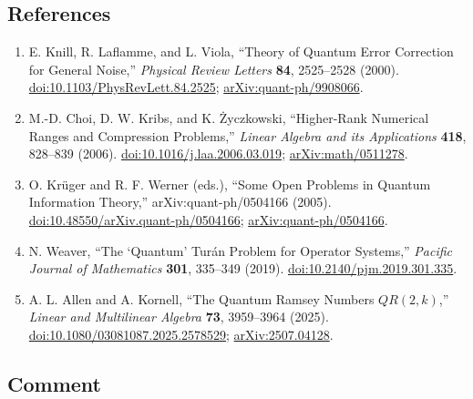 \subsection*{References}

\begin{enumerate}[label={},leftmargin=4.8em,labelsep=0.5em]
  \footnotesize
  \item[\textup{[KLV00]}]\label{ref:p14-knill-laflamme-viola}
  E. Knill, R. Laflamme, and L. Viola,
  ``Theory of Quantum Error Correction for General Noise,''
  \emph{Physical Review Letters} \textbf{84}, 2525--2528 (2000).
  \href{https://doi.org/10.1103/PhysRevLett.84.2525}{doi:10.1103/PhysRevLett.84.2525};
  \href{https://arxiv.org/abs/quant-ph/9908066}{arXiv:quant-ph/9908066}.

  \item[\textup{[CKZ06]}]\label{ref:p14-choi-et-al}
  M.-D. Choi, D. W. Kribs, and K. Życzkowski,
  ``Higher-Rank Numerical Ranges and Compression Problems,''
  \emph{Linear Algebra and its Applications} \textbf{418}, 828--839 (2006).
  \href{https://doi.org/10.1016/j.laa.2006.03.019}{doi:10.1016/j.laa.2006.03.019};
  \href{https://arxiv.org/abs/math/0511278}{arXiv:math/0511278}.

  \item[\textup{[KW05]}]\label{ref:p14-krueger-werner}
  O. Krüger and R. F. Werner (eds.),
  ``Some Open Problems in Quantum Information Theory,''
  arXiv:quant-ph/0504166 (2005).
  \href{https://doi.org/10.48550/arXiv.quant-ph/0504166}{doi:10.48550/arXiv.quant-ph/0504166};
  \href{https://arxiv.org/abs/quant-ph/0504166}{arXiv:quant-ph/0504166}.

  \item[\textup{[Wea19]}]\label{ref:p14-weaver}
  N. Weaver,
  ``The `Quantum' Turán Problem for Operator Systems,''
  \emph{Pacific Journal of Mathematics} \textbf{301}, 335--349 (2019).
  \href{https://doi.org/10.2140/pjm.2019.301.335}{doi:10.2140/pjm.2019.301.335}.

  \item[\textup{[AK25]}]\label{ref:p14-allen-kornell}
  A. L. Allen and A. Kornell,
  ``The Quantum Ramsey Numbers $QR(2,k)$,''
  \emph{Linear and Multilinear Algebra} \textbf{73}, 3959--3964 (2025).
  \href{https://doi.org/10.1080/03081087.2025.2578529}{doi:10.1080/03081087.2025.2578529};
  \href{https://arxiv.org/abs/2507.04128}{arXiv:2507.04128}.
\end{enumerate}

\subsection*{Comment}

